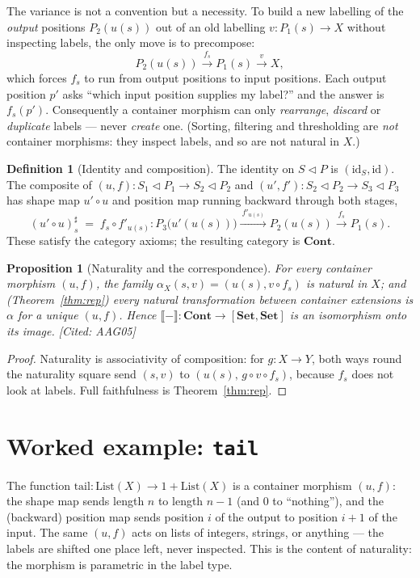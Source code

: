 \documentclass[11pt,a4paper]{book}
\newcommand{\Set}{\mathbf{Set}}
\newcommand{\Cont}{\mathbf{Cont}}
\newcommand{\cont}[2]{#1 \triangleleft #2}
\newcommand{\Ext}[1]{\llbracket #1 \rrbracket}
\newcommand{\id}{\mathrm{id}}
\theoremstyle{plain}
\newtheorem{Proposition}[Theorem]{Proposition}
\theoremstyle{definition}
\newtheorem{Definition}[Theorem]{Definition}
\theoremstyle{remark}
\newcommand{\prov}[1]{\hfill\textsf{\footnotesize[#1]}}
\begin{document}
The variance is not a convention but a necessity. To build a new labelling of the
\emph{output} positions $P_2(u(s))$ out of an old labelling $v\colon P_1(s)\to X$
without inspecting labels, the only move is to precompose:
\[
  P_2(u(s)) \xrightarrow{\ f_s\ } P_1(s) \xrightarrow{\ v\ } X,
\]
which forces $f_s$ to run from output positions to input positions. Each output
position $p'$ asks ``which input position supplies my label?'' and the answer is
$f_s(p')$. Consequently a container morphism can only \emph{rearrange},
\emph{discard} or \emph{duplicate} labels --- never \emph{create} one. (Sorting,
filtering and thresholding are \emph{not} container morphisms: they inspect
labels, and so are not natural in $X$.)

\begin{Definition}[Identity and composition]\label{def:contcomp}
The identity on $\cont SP$ is $(\id_S,\id)$. The composite of
$(u,f)\colon\cont{S_1}{P_1}\to\cont{S_2}{P_2}$ and
$(u',f')\colon\cont{S_2}{P_2}\to\cont{S_3}{P_3}$ has shape map $u'\circ u$ and
position map running backward through both stages,
\[
  (u'\circ u)^\sharp_s \;=\; f_s\circ f'_{u(s)}\colon
   P_3\bigl(u'(u(s))\bigr) \xrightarrow{\ f'_{u(s)}\ } P_2(u(s))
   \xrightarrow{\ f_s\ } P_1(s).
\]
These satisfy the category axioms; the resulting category is $\Cont$.
\end{Definition}

\begin{Proposition}[Naturality and the correspondence]\label{prop:nat}
For every container morphism $(u,f)$, the family $\alpha_X(s,v)=(u(s),v\circ f_s)$
is natural in $X$; and (Theorem~\ref{thm:rep}) every natural transformation
between container extensions is $\alpha$ for a unique $(u,f)$. Hence
$\Ext{-}\colon\Cont\to[\Set,\Set]$ is an isomorphism onto its image.
\prov{Cited: AAG05}
\end{Proposition}

\begin{proof}
Naturality is associativity of composition: for $g\colon X\to Y$, both ways round
the naturality square send $(s,v)$ to $(u(s),\, g\circ v\circ f_s)$, because
$f_s$ does not look at labels. Full faithfulness is Theorem~\ref{thm:rep}.
\end{proof}

\section{Worked example: \texttt{tail}}

The function $\mathrm{tail}\colon\mathrm{List}(X)\to 1+\mathrm{List}(X)$ is a
container morphism $(u,f)$: the shape map sends length $n$ to length $n-1$ (and
$0$ to ``nothing''), and the (backward) position map sends position $i$ of the
output to position $i+1$ of the input. The same $(u,f)$ acts on lists of integers,
strings, or anything --- the labels are shifted one place left, never inspected.
This is the content of naturality: the morphism is parametric in the label type.
\end{document}
